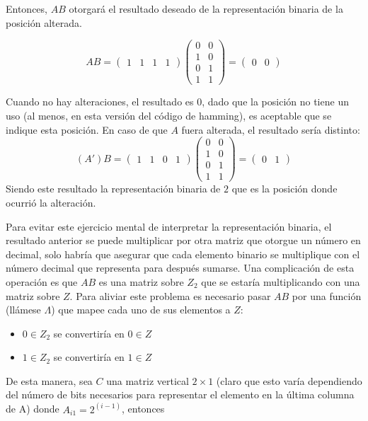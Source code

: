 \documentclass{article}
\begin{document}
Entonces, $AB$ otorgará el resultado deseado de la representación binaria de la posición alterada.

$$
AB = \begin{pmatrix}
    1 & 1 & 1 & 1
\end{pmatrix} 
\begin{pmatrix}
    0 & 0 \\
    1 & 0 \\
    0 & 1 \\
    1 & 1
\end{pmatrix}
= \begin{pmatrix}
    0 & 0
\end{pmatrix}
$$

Cuando no hay alteraciones, el resultado es $0$, dado que la posición no tiene un uso (al menos, en esta versión del código de hamming), es aceptable que se indique esta posición. En caso de que $A$ fuera alterada, el resultado sería distinto:
$$
(A')B = \begin{pmatrix}
    1 & 1 & 0 & 1
\end{pmatrix} 
\begin{pmatrix}
    0 & 0 \\
    1 & 0 \\
    0 & 1 \\
    1 & 1
\end{pmatrix}
= \begin{pmatrix}
    0 & 1
\end{pmatrix}
$$
Siendo este resultado la representación binaria de $2$ que es la posición donde ocurrió la alteración.

Para evitar este ejercicio mental de interpretar la representación binaria, el resultado anterior se puede multiplicar por otra matriz que otorgue un número en decimal, solo habría que asegurar que cada elemento binario se multiplique con el número decimal que representa para después sumarse. Una complicación de esta operación es que $AB$ es una matriz sobre $Z_2$ que se estaría multiplicando con una matriz sobre $Z$. Para aliviar este problema es necesario pasar $AB$ por una función (llámese $\Lambda$) que mapee cada uno de sus elementos a $Z$:
\begin{itemize}
    \item $0 \in Z_2$ se convertiría en $0 \in Z$
    \item $1 \in Z_2$ se convertiría en $1 \in Z$
\end{itemize}

De esta manera, sea $C$ una matriz vertical $2 \times 1$ (claro que esto varía dependiendo del número de bits necesarios para representar el elemento en la última columna de A) donde $A_{i1} = 2^(i-1)$, entonces
\end{document}
